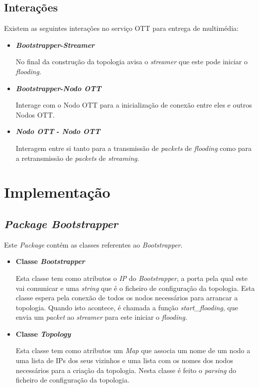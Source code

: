 \documentclass[a4paper, 11pt]{article}
\begin{document}
\subsection{Interações}

Existem as seguintes interações no serviço OTT para entrega de multimédia:

\begin{itemize}
    \item \textbf{\textit{Bootstrapper}-\textit{Streamer}}
    
    No final da construção da topologia avisa o \textit{streamer} que este pode iniciar o \textit{flooding}.
    
    \item \textbf{\textit{Bootstrapper}-\textit{Nodo OTT}}
    
    Interage com o Nodo OTT para a inicialização de conexão entre eles e outros Nodos OTT.
    
    \item \textbf{\textit{Nodo OTT} - \textit{Nodo OTT}}
    
    Interagem entre si tanto para a transmissão de \textit{packets} de \textit{flooding} como para a retransmissão de \textit{packets} de \textit{streaming}.
    
\end{itemize}




\section{Implementação}

\subsection{\textit{Package Bootstrapper}}

Este \textit{Package} contém as classes referentes ao \textit{Bootstrapper}.

\begin{itemize}

    \item \textbf{Classe \textit{Bootstrapper}}
    
    Esta classe tem como atributos o \textit{IP} do \textit{Bootstrapper}, a porta pela qual este vai comunicar e uma \textit{string} que é o ficheiro de configuração da topologia. Esta classe espera pela conexão de todos os nodos necessários para arrancar a topologia. Quando isto acontece, é chamada a função \textit{start\_flooding}, que envia um \textit{packet} ao \textit{streamer} para este iniciar o \textit{flooding}.

    \item \textbf{Classe \textit{Topology}}
    
    Esta classe tem como atributos um \textit{Map} que associa um nome de um nodo a uma lista de IPs dos seus vizinhos e uma lista com os nomes dos nodos necessários para a criação da topologia. Nesta classe é feito o \textit{parsing} do ficheiro de configuração da topologia.
    
\end{itemize}
\end{document}
